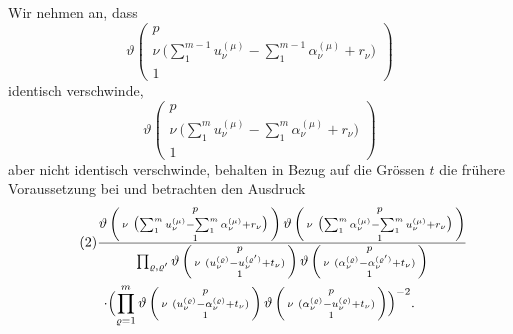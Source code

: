 \documentclass[12pt,a4paper]{book}
\theoremstyle{definition}
\theoremstyle{remark}
\begin{document}
Wir nehmen an, dass
\[ \vartheta\left(\begin{array}{c} p\\ \nu\ \bigl(\sum\limits_1^{m-1} u_\nu^{(\mu)} - \sum\limits_1^{m-1} \alpha_\nu^{(\mu)} + r_\nu\bigr)\\ 1 \end{array}\right) \]
identisch verschwinde,
\[ \vartheta\left(\begin{array}{c} p\\ \nu\ \bigl(\sum\limits_1^m u_\nu^{(\mu)} - \sum\limits_1^m \alpha_\nu^{(\mu)} + r_\nu\bigr)\\ 1 \end{array}\right) \]
aber nicht identisch verschwinde, behalten in Bezug auf die Grössen $t$ die frühere Voraussetzung bei und betrachten den Ausdruck
\begin{multline}
\tag{2}
\frac{\vartheta\left(\begin{smallmatrix} p\\ \nu\ \bigl(\sum_1^m u_\nu^{(\mu)} - \sum_1^m \alpha_\nu^{(\mu)} + r_\nu\bigr)\\ 1 \end{smallmatrix}\right)
\vartheta\left(\begin{smallmatrix} p\\ \nu\ \bigl(\sum_1^m \alpha_\nu^{(\mu)} - \sum_1^m u_\nu^{(\mu)} + r_\nu\bigr)\\ 1 \end{smallmatrix}\right)}{\prod_{\varrho,\varrho'}
\vartheta\left(\begin{smallmatrix} p\\ \nu\ (u_\nu^{(\varrho)} - u_\nu^{(\varrho')} + t_\nu)\\ 1 \end{smallmatrix}\right)
\vartheta\left(\begin{smallmatrix} p\\ \nu\ (\alpha_\nu^{(\varrho)} - \alpha_\nu^{(\varrho')} + t_\nu)\\ 1 \end{smallmatrix}\right)}\\
\cdot\Bigl(\prod_{\varrho=1}^m
\vartheta\left(\begin{smallmatrix} p\\ \nu\ (u_\nu^{(\varrho)} - \alpha_\nu^{(\varrho)} + t_\nu)\\ 1 \end{smallmatrix}\right)
\vartheta\left(\begin{smallmatrix} p\\ \nu\ (\alpha_\nu^{(\varrho)} - u_\nu^{(\varrho)} + t_\nu)\\ 1 \end{smallmatrix}\right)\Bigr)^{-2}.
\end{multline}
\end{document}

